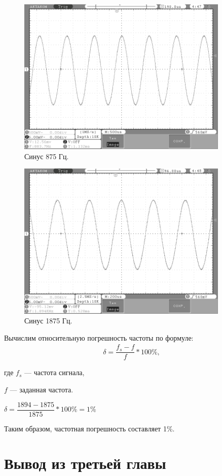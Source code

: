 		\begin{figure}[H]
    \centering
    \includegraphics[width=0.9\textwidth]{../image/875.bmp}
    \caption{Синус 875 Гц.}
	\end{figure}	
	
	\begin{figure}[H]
    \centering
    \includegraphics[width=0.9\textwidth]{../image/1875.bmp}
    \caption{Синус 1875 Гц.}
	\end{figure}	
	
	Вычислим относительную погрешность частоты по формуле:
	\begin{gather}
	\delta=\dfrac{f_{s}-f}{f}*100\%,
	\end{gather}
	
	где $f_{s}$ --- частота сигнала,
	
	$f$ --- заданная частота.
	
	\begin{center}
	$\delta=\dfrac{1894-1875}{1875}*100\%=1\%$
	\end{center}
	
	Таким образом, частотная погрешность составляет 1\%.
	
	
	

\section{Вывод из третьей главы}
